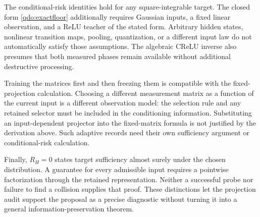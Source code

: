 The conditional-risk identities hold for any square-integrable target. The
closed form \eqref{qdo:exactfloor} additionally requires Gaussian inputs,
a fixed linear observation, and a ReLU teacher of the stated form. Arbitrary
hidden states, nonlinear transition maps, pooling, quantization, or a different
input law do not automatically satisfy those assumptions. The algebraic CReLU
inverse also presumes that both measured phases remain available without
additional destructive processing.

Training the matrices first and then freezing them is compatible with the
fixed-projection calculation. Choosing a different measurement matrix as a
function of the current input is a different observation model: the selection
rule and any retained selector must be included in the conditioning
information. Substituting an input-dependent projector into the fixed-matrix
formula is not justified by the derivation above. Such adaptive records need
their own sufficiency argument or conditional-risk calculation.

Finally, $R_H=0$ states target sufficiency almost surely under the chosen
distribution. A guarantee for every admissible input requires a pointwise
factorization through the retained representation. Neither a successful probe
nor failure to find a collision supplies that proof. These distinctions let the
projection audit support the proposal as a precise diagnostic without turning
it into a general information-preservation theorem.
